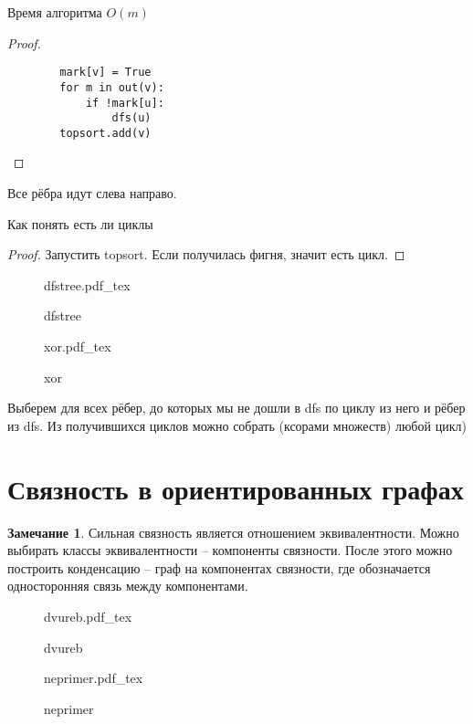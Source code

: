 \documentclass{book}
\theoremstyle{definition}
\newtheorem*{note}{Замечание}
\newcommand{\incfig}[1]{%
    \def\svgwidth{\columnwidth}
    {#1.pdf_tex}
}
\begin{document}
Время алгоритма $O(m)$

\begin{proof}
    \begin{lstlisting}
        mark[v] = True
        for m in out(v):
            if !mark[u]:
                dfs(u)
        topsort.add(v)
    \end{lstlisting}
\end{proof}

\begin{statement}
    Все рёбра идут слева направо. 
\end{statement}

\begin{problem}
    Как понять есть ли циклы
\end{problem}
\begin{proof}
    Запустить topsort. Если получилась фигня, значит есть цикл.
\end{proof}

\begin{figure}[!ht]
    \centering
    \incfig{dfstree}
    \caption{dfstree}
    \label{fig:dfstree}
\end{figure}

\begin{figure}[!ht]
    \centering
    \incfig{xor}
    \caption{xor}
    \label{fig:xor}
\end{figure}


Выберем для всех рёбер, до которых мы не дошли в dfs по циклу из него и рёбер из dfs. Из получившихся циклов можно собрать (ксорами множеств) любой цикл)

\section{Связность в ориентированных графах}

\begin{note}
    Сильная связность является отношением эквивалентности. Можно выбирать классы эквивалентности -- компоненты связности. После этого можно построить конденсацию -- граф на компонентах связности, где обозначается односторонняя связь между компонентами.

\begin{figure}[!ht]
    \centering
    \incfig{dvureb}
    \caption{dvureb}
    \label{fig:dvureb}
\end{figure}
\end{note}

\begin{figure}[!ht]
    \centering
    \incfig{neprimer}
    \caption{neprimer}
    \label{fig:neprimer}
\end{figure}
\end{document}
